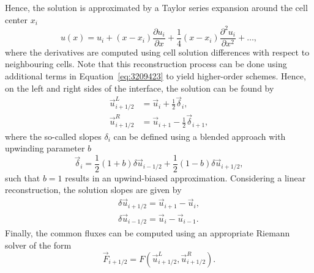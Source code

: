 Hence, the solution is approximated by a Taylor series expansion around the cell center $x_i$
\begin{equation}
	u(x) = u_i + (x-x_i)\frac{\partial u_i}{\partial x} + \frac{1}{4}(x-x_i)\frac{\partial^2 u_i}{\partial x^2} + \ldots,
	\label{eq:3209423}
\end{equation}
where the derivatives are computed using cell solution differences with respect to neighbouring cells. Note that this reconstruction process can be done using additional terms in Equation~\ref{eq:3209423} to yield higher-order schemes. Hence, on the left and right sides of the interface, the solution can be found by
\begin{align}
	\vec u_{i+1/2}^L &= \vec u_i + \frac{1}{2} \vec \delta_i,\\
	\vec u_{i+1/2}^R &= \vec u_{i+1} - \frac{1}{2} \vec \delta_{i+1},
\end{align}
where the so-called slopes $\delta_i$ can be defined using a blended approach with upwinding parameter $b$
\begin{equation}
	\vec \delta_i = \frac{1}{2}(1+b)\delta \vec u_{i-1/2} + \frac{1}{2}(1-b)\delta \vec u_{i+1/2},
	\label{eq:48742938}
\end{equation}
such that $b=1$ results in an upwind-biased approximation. Considering a linear reconstruction, the solution slopes are given by
\begin{align}
	 \delta \vec u_{i+1/2} = \vec u_{i+1} - \vec u_i, \\
	 \delta \vec u_{i-1/2} = \vec u_{i} - \vec u_{i-1}.
\end{align}
Finally, the common fluxes can be computed using an appropriate Riemann solver of the form
\begin{equation}
	\vec F_{i+1/2} = F(\vec u^L_{i+1/2},\vec  u^R_{i+1/2}).
\end{equation}
